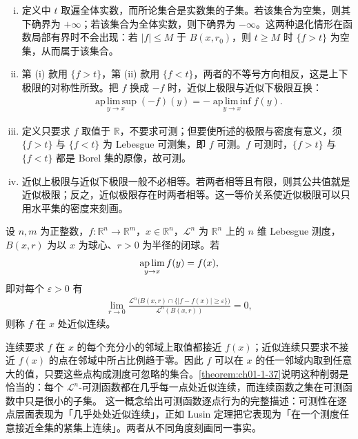 \documentclass[../../main.tex]{subfiles}%
\begin{document}
\begin{remark}\label{remark:ch01-def-1-28-条件}
\begin{enumerate}[(i)]
\item 定义中 $t$ 取遍全体实数，而所论集合是实数集的子集。若该集合为空集，则其下确界为 $+\infty$；若该集合为全体实数，则下确界为 $-\infty$。这两种退化情形在函数局部有界时不会出现：若 $\lvert f\rvert\leqslant M$ 于 $B(x,r_0)$，则 $t\geqslant M$ 时 $\{f>t\}$ 为空集，从而属于该集合。
\item 第 (i) 款用 $\{f>t\}$，第 (ii) 款用 $\{f<t\}$，两者的不等号方向相反，这是上下极限的对称性所致。把 $f$ 换成 $-f$ 时，近似上极限与近似下极限互换：
\begin{align*}
\operatorname*{ap\,lim\,sup}_{y\to x}(-f)(y)=-\operatorname*{ap\,lim\,inf}_{y\to x}f(y) .
\end{align*}
\item 定义只要求 $f$ 取值于 $\mathbb{R}$，不要求可测；但要使所述的极限与密度有意义，须 $\{f>t\}$ 与 $\{f<t\}$ 为 Lebesgue 可测集，即 $f$ 可测。$f$ 可测时，$\{f>t\}$ 与 $\{f<t\}$ 都是 Borel 集的原像，故可测。
\item 近似上极限与近似下极限一般不必相等。若两者相等且有限，则其公共值就是近似极限；反之，近似极限存在时两者相等。这一等价关系使近似极限可以只用水平集的密度来刻画。
\end{enumerate}
\end{remark}

\begin{definition}[近似连续]\label{definition:ch01-1-29}
设 $n,m$ 为正整数，$f:\mathbb{R}^n\to\mathbb{R}^m$，$x\in\mathbb{R}^n$，$\mathcal{L}^{n}$ 为 $\mathbb{R}^n$ 上的 $n$ 维 Lebesgue 测度，$B(x,r)$ 为以 $x$ 为球心、$r>0$ 为半径的闭球。若
\begin{align*}
\operatorname*{ap\,lim}_{y\to x}f(y)=f(x) ,
\end{align*}
即对每个 $\varepsilon>0$ 有
\begin{align*}
\lim_{r\to0}\frac{\mathcal{L}^{n}\bigl(B(x,r)\cap\{\lvert f-f(x)\rvert\geqslant\varepsilon\}\bigr)}{\mathcal{L}^{n}(B(x,r))}=0 ,
\end{align*}
则称 $f$ 在 $x$ 处近似连续。
\end{definition}

\begin{remark}\label{remark:ch01-def-1-29-动机}
连续要求 $f$ 在 $x$ 的每个充分小的邻域上取值都接近 $f(x)$；近似连续只要求不接近 $f(x)$ 的点在邻域中所占比例趋于零。因此 $f$ 可以在 $x$ 的任一邻域内取到任意大的值，只要这些点构成测度可忽略的集合。\cref{theorem:ch01-1-37}说明这种削弱是恰当的：每个 $\mathcal{L}^{n}$-可测函数都在几乎每一点处近似连续，而连续函数之集在可测函数中只是很小的子集。%
这一概念给出可测函数逐点行为的完整描述：可测性在逐点层面表现为「几乎处处近似连续」，正如 Lusin 定理把它表现为「在一个测度任意接近全集的紧集上连续」。两者从不同角度刻画同一事实。
\end{remark}
\end{document}
